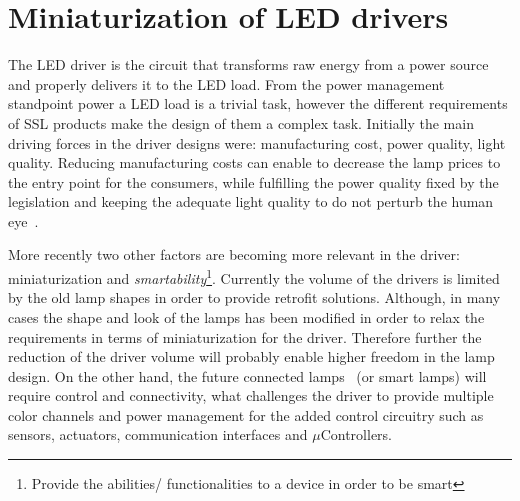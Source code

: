 \chapter{Miniaturization of LED drivers}
%

The LED driver is the circuit that transforms raw energy from a power source and properly delivers it to the LED load. From the power management standpoint power a LED load is a trivial task, however the different requirements of SSL products make the design of them a complex task. Initially the main driving forces in the driver designs were: manufacturing cost, power quality, light quality. Reducing manufacturing costs can enable to decrease the lamp prices to the entry point for the consumers, while fulfilling the power quality fixed by the legislation and keeping the adequate light quality to do not perturb the human eye~\cite{10Wilkins}.

More recently two other factors are becoming more relevant in the driver: miniaturization and \emph{smartability}\footnote{Provide the abilities/ functionalities to a device in order to be smart}. Currently the volume of the drivers is limited by the old lamp shapes in order to provide retrofit solutions. Although, in many cases the shape and look of the lamps has been modified in order to relax the requirements in terms of miniaturization for the driver. Therefore further the reduction of the driver volume will probably enable higher freedom in the lamp design. On the other hand, the future connected lamps~\cite{14Harbers} (or smart lamps) will require control and connectivity, what challenges the driver to provide multiple color channels and power management for the added control circuitry such as sensors, actuators, communication interfaces and $\mu$Controllers.


